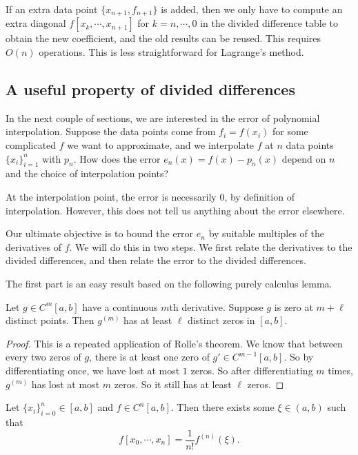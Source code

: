 \documentclass[a4paper]{article}
\begin{document}
If an extra data point $\{x_{n + 1}, f_{n + 1}\}$ is added, then we only have to compute an extra diagonal $f[x_k, \cdots, x_{n + 1}]$ for $k =n, \cdots, 0$ in the divided difference table to obtain the new coefficient, and the old results can be reused. This requires $O(n)$ operations. This is less straightforward for Lagrange's method.

\subsection{A useful property of divided differences}
In the next couple of sections, we are interested in the error of polynomial interpolation. Suppose the data points come from $f_i = f(x_i)$ for some complicated $f$ we want to approximate, and we interpolate $f$ at $n$ data points $\{x_i\}_{i = 1}^n$ with $p_n$. How does the error $e_n(x) = f(x) - p_n(x)$ depend on $n$ and the choice of interpolation points?

At the interpolation point, the error is necessarily $0$, by definition of interpolation. However, this does not tell us anything about the error elsewhere.

Our ultimate objective is to bound the error $e_n$ by suitable multiples of the derivatives of $f$. We will do this in two steps. We first relate the derivatives to the divided differences, and then relate the error to the divided differences.

The first part is an easy result based on the following purely calculus lemma.
\begin{lemma}
  Let $g \in C^m[a, b]$ have a continuous $m$th derivative. Suppose $g$ is zero at $m + \ell$ distinct points. Then $g^{(m)}$ has at least $\ell$ distinct zeros in $[a, b]$.
\end{lemma}

\begin{proof}
  This is a repeated application of Rolle's theorem. We know that between every two zeros of $g$, there is at least one zero of $g' \in C^{m - 1}[a, b]$. So by differentiating once, we have lost at most $1$ zeros. So after differentiating $m$ times, $g^{(m)}$ has lost at most $m$ zeros. So it still has at least $\ell$ zeros.
\end{proof}

\begin{thm}
  Let $\{x_i\}_{i = 0}^n \in [a, b]$ and $f \in C^n[a, b]$. Then there exists some $\xi \in (a, b)$ such that
  \[
    f[x_0, \cdots, x_n] = \frac{1}{n!} f^{(n)}(\xi).
  \]
\end{thm}
\end{document}
